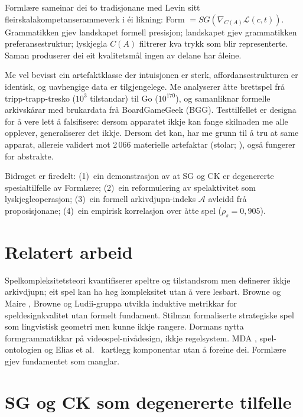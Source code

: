 \documentclass[10pt,twocolumn]{article}
\begin{document}
Forml\ae re \citep{finne2026} sameinar dei to tradisjonane med Levin sitt fleirskalakompetanserammeverk \citep{fields2022,doctor2024} i \'ei likning: Form $= SG(\nabla_{C(A)} \mathcal{L}(c,t))$. Grammatikken gjev landskapet formell presisjon; landskapet gjev grammatikken preferansestruktur; lyskjegla $C(A)$ filtrerer kva trykk som blir representerte. Saman produserer dei eit kvalitetsm\aa l ingen av delane har \aa leine.

Me vel bevisst ein artefaktklasse der intuisjonen er sterk, affordansestrukturen er identisk, og uavhengige data er tilgjengelege. Me analyserer \aa tte brettspel fr\aa{} tripp-trapp-tresko ($10^3$ tilstandar) til Go ($10^{170}$), og samanliknar formelle arkivskårar med brukardata fr\aa{} BoardGameGeek (BGG). Testtilfellet er designa for \aa{} vere lett \aa{} falsifisere: dersom apparatet ikkje kan fange skilnaden me alle opplever, generaliserer det ikkje. Dersom det kan, har me grunn til \aa{} tru at same apparat, allereie validert mot 2\,066 materielle artefaktar (stolar; \citealp{finne2026}), ogs\aa{} fungerer for abstrakte.

Bidraget er firedelt: (1)~ein demonstrasjon av at SG og CK er degenererte spesialtilfelle av Forml\ae re; (2)~ein reformulering av spelaktivitet som lyskjegleoperasjon; (3)~ein formell arkivdjupn-indeks $\mathcal{A}$ avleidd fr\aa{} proposisjonane; (4)~ein empirisk korrelasjon over \aa tte spel ($\rho_s = 0{,}905$).


\section{Relatert arbeid}

Spelkompleksitetsteori \citep{shannon1950,allis1994,vandenherik2002,schaeffer2007,takizawa2023} kvantifiserer speltre og tilstandsrom men definerer ikkje arkivdjupn; eit spel kan ha h\o g kompleksitet utan \aa{} vere lesbart. Browne og Maire \citep{browne2010}, Browne \citep{browne2012} og Ludii-gruppa \citep{piette2020} utvikla induktive metrikkar for speldesignkvalitet utan formelt fundament. Stilman \citep{stilman2000} formaliserte strategiske spel som lingvistisk geometri men kunne ikkje rangere. Dormans \citep{dormans2010} nytta formgrammatikkar p\aa{} videospel-niv\aa design, ikkje regelsystem. MDA \citep{hunicke2004}, spel-ontologien \citep{zagal2005} og Elias et al.\ \citep{elias2012} kartlegg komponentar utan \aa{} foreine dei. Forml\ae re gjev fundamentet som manglar.


\section{SG og CK som degenererte tilfelle}
\end{document}
